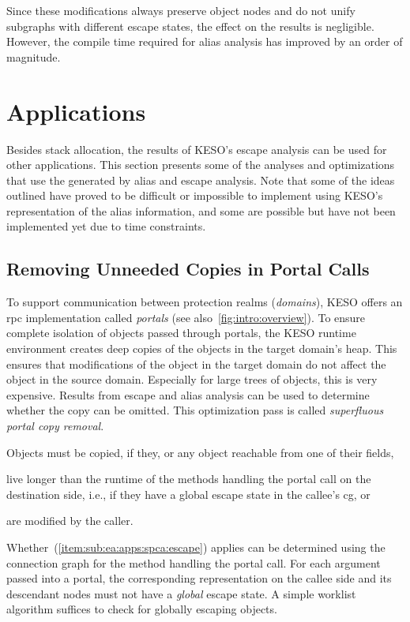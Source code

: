 				Since these modifications always preserve object nodes and do not unify subgraphs with different escape states,
				the effect on the results is negligible. However, the compile time required for alias analysis has improved by
				an order of magnitude.

	\section{Applications}
		\label{sec:ea:apps}
		Besides stack allocation, the results of KESO's escape analysis can be used for other applications. This section
		presents some of the analyses and optimizations that use the  generated by alias and escape analysis.
		Note that some of the ideas outlined have proved to be difficult or impossible to implement using KESO's
		representation of the alias information, and some are possible but have not been implemented yet due to time
		constraints.

		\subsection{Removing Unneeded Copies in Portal Calls}
			\label{sub:ea:apps:spca}
			To support communication between protection realms (\emph{domains}), KESO offers an \gls{rpc} implementation
			called \emph{portals} (see also~\cref{fig:intro:overview}). To ensure complete isolation of objects passed through
			portals, the KESO runtime environment creates deep copies of the objects in the target domain's heap. This ensures
			that modifications of the object in the target domain do not affect the object in the source domain. Especially
			for large trees of objects, this is very expensive. Results from escape and alias analysis can be used to
			determine whether the copy can be omitted. This optimization pass is called \emph{superfluous portal copy
			removal}.

			Objects must be copied, if they, or any object reachable from one of their fields, \begin{inparaenum}[(a)]
				\item live longer than the runtime of the methods handling the portal call on the destination side, i.e., if
					they have a global escape state in the callee's \gls{cg}, or \label{item:sub:ea:apps:spca:escape}
				\item are modified by the caller. \label{item:sub:ea:apps:spca:write}
			\end{inparaenum} Whether~(\ref{item:sub:ea:apps:spca:escape}) applies can be determined using the connection graph
			for the method handling the portal call. For each argument passed into a portal, the corresponding representation
			on the callee side and its descendant nodes must not have a \emph{global} escape state. A simple worklist
			algorithm suffices to check for globally escaping objects.

